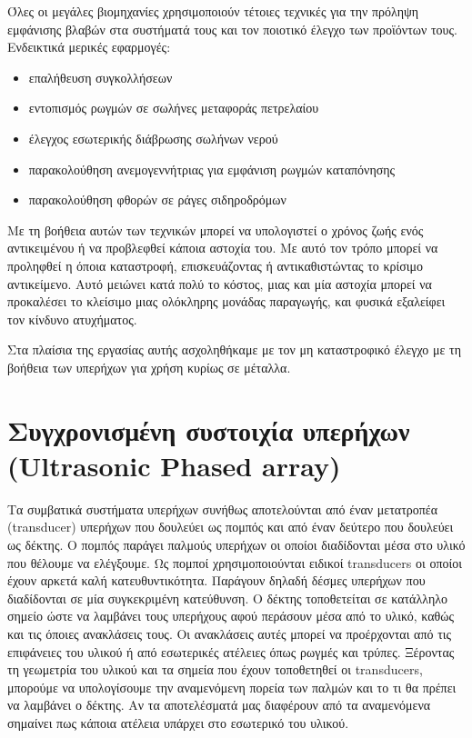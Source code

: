 \documentclass[12pt,a4paper]{book}
\begin{document}
Όλες οι μεγάλες βιομηχανίες χρησιμοποιούν τέτοιες τεχνικές για την πρόληψη εμφάνισης βλαβών στα συστήματά τους και τον ποιοτικό έλεγχο των προϊόντων τους. Ενδεικτικά μερικές εφαρμογές:
\begin{itemize}
\item επαλήθευση συγκολλήσεων 
\item εντοπισμός ρωγμών σε σωλήνες μεταφοράς πετρελαίου
\item έλεγχος εσωτερικής διάβρωσης σωλήνων νερού
\item παρακολούθηση ανεμογεννήτριας για εμφάνιση ρωγμών καταπόνησης
\item παρακολούθηση φθορών σε ράγες σιδηροδρόμων
\end{itemize}
Με τη βοήθεια αυτών των τεχνικών μπορεί να υπολογιστεί ο χρόνος ζωής ενός αντικειμένου ή να προβλεφθεί κάποια αστοχία του. Με αυτό τον τρόπο μπορεί να προληφθεί η όποια καταστροφή, επισκευάζοντας ή αντικαθιστώντας το κρίσιμο αντικείμενο. Αυτό μειώνει κατά πολύ το κόστος, μιας και μία αστοχία μπορεί να προκαλέσει το κλείσιμο μιας ολόκληρης μονάδας παραγωγής, και φυσικά εξαλείφει τον κίνδυνο ατυχήματος.

Στα πλαίσια της εργασίας αυτής ασχοληθήκαμε με τον μη καταστροφικό έλεγχο με τη βοήθεια των υπερήχων για χρήση κυρίως σε μέταλλα.



\section{Συγχρονισμένη συστοιχία υπερήχων (Ultrasonic Phased array)}
Τα συμβατικά συστήματα υπερήχων συνήθως αποτελούνται από έναν μετατροπέα (transducer) υπερήχων που δουλεύει ως πομπός και από έναν δεύτερο που δουλεύει ως δέκτης. Ο πομπός παράγει παλμούς υπερήχων οι οποίοι διαδίδονται μέσα στο υλικό που θέλουμε να ελέγξουμε. Ως πομποί χρησιμοποιούνται ειδικοί transducers οι οποίοι έχουν αρκετά καλή κατευθυντικότητα. Παράγουν δηλαδή δέσμες υπερήχων που διαδίδονται σε μία συγκεκριμένη κατεύθυνση. Ο δέκτης τοποθετείται σε κατάλληλο σημείο ώστε να λαμβάνει τους υπερήχους αφού περάσουν μέσα από το υλικό, καθώς και τις όποιες ανακλάσεις τους. Οι ανακλάσεις αυτές μπορεί να προέρχονται από τις επιφάνειες του υλικού ή από εσωτερικές ατέλειες όπως ρωγμές και τρύπες. Ξέροντας τη γεωμετρία του υλικού και τα σημεία που έχουν τοποθετηθεί οι transducers, μπορούμε να υπολογίσουμε την αναμενόμενη πορεία των παλμών και το τι θα πρέπει να λαμβάνει ο δέκτης. Αν τα αποτελέσματά μας διαφέρουν από τα αναμενόμενα σημαίνει πως κάποια ατέλεια υπάρχει στο εσωτερικό του υλικού. 
\end{document}
